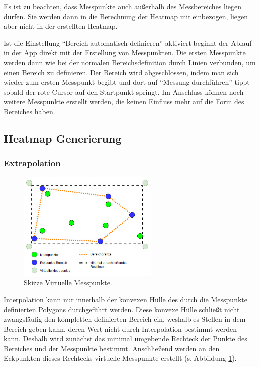 \documentclass[10pt]{scrartcl}
\begin{document}
Es ist zu beachten, dass Messpunkte auch außerhalb des Messbereiches liegen dürfen. Sie werden dann in die Berechnung der Heatmap mit einbezogen, liegen aber nicht in der erstellten Heatmap.

Ist die Einstellung \enquote{Bereich automatisch definieren} aktiviert beginnt der Ablauf in der App direkt mit der Erstellung von Messpunkten. Die ersten Messpunkte werden dann wie bei der normalen Bereichsdefinition durch Linien verbunden, um einen Bereich zu definieren. Der Bereich wird abgeschlossen, indem man sich wieder zum ersten Messpunkt begibt und dort auf \enquote{Messung durchführen} tippt sobald der rote Cursor auf den Startpunkt springt. Im Anschluss können noch weitere Messpunkte erstellt werden, die keinen Einfluss mehr auf die Form des Bereiches haben.


\subsection{Heatmap Generierung}
\subsubsection{Extrapolation}
\begin{figure}
\centering
\includegraphics[width=0.6\textwidth]{images/ba_virtuelle_messpunkte.jpg}
\caption{\label{img:virtuelle_messpunkte}Skizze Virtuelle Messpunkte.}
\end{figure}
Interpolation kann nur innerhalb der konvexen Hülle des durch die Messpunkte definierten Polygons durchgeführt werden. Diese konvexe Hülle schließt nicht zwangsläufig den kompletten definierten Bereich ein, weshalb es Stellen in dem Bereich geben kann, deren Wert nicht durch Interpolation bestimmt werden kann. Deshalb wird zunächst das minimal umgebende Rechteck der Punkte des Bereiches und der Messpunkte bestimmt. Anschließend werden an den Eckpunkten dieses Rechtecks virtuelle Messpunkte erstellt (s. Abbildung \ref{img:virtuelle_messpunkte}).
\end{document}
